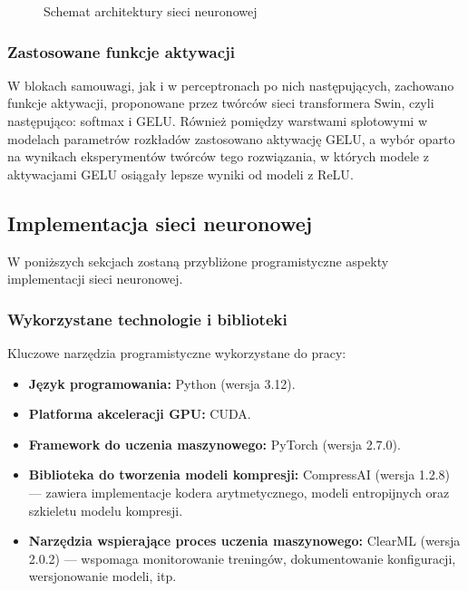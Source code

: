 \begin{figure}[h!]
	\centering
	
	\caption{Schemat architektury sieci neuronowej}
	\label{fig:schemat-architektury}
\end{figure}

\subsubsection{Zastosowane funkcje aktywacji}
W blokach samouwagi, jak i w perceptronach po nich następujących, zachowano funkcje aktywacji, proponowane przez twórców sieci transformera Swin, czyli następująco: softmax i GELU. Również pomiędzy warstwami splotowymi w modelach parametrów rozkładów zastosowano aktywację GELU, a wybór oparto na wynikach eksperymentów twórców tego rozwiązania, w których modele z aktywacjami GELU osiągały lepsze wyniki od modeli z ReLU\cite{hendrycks2023gaussianerrorlinearunits}.

\subsection{Implementacja sieci neuronowej}
W poniższych sekcjach zostaną przybliżone programistyczne aspekty implementacji sieci neuronowej.

\subsubsection{Wykorzystane technologie i biblioteki}
Kluczowe narzędzia programistyczne wykorzystane do pracy:
\begin{itemize}
	\item \textbf{Język programowania:} Python (wersja 3.12).
	\item \textbf{Platforma akceleracji GPU:} CUDA.
	\item \textbf{Framework do uczenia maszynowego:} PyTorch (wersja 2.7.0).
	\item \textbf{Biblioteka do tworzenia modeli kompresji:} CompressAI (wersja 1.2.8) --- zawiera implementacje kodera arytmetycznego, modeli entropijnych oraz szkieletu modelu kompresji\cite{begaint2020compressaipytorchlibraryevaluation}.
	\item \textbf{Narzędzia wspierające proces uczenia maszynowego:} ClearML (wersja 2.0.2) --- wspomaga monitorowanie treningów, dokumentowanie konfiguracji, wersjonowanie modeli, itp.
\end{itemize}

